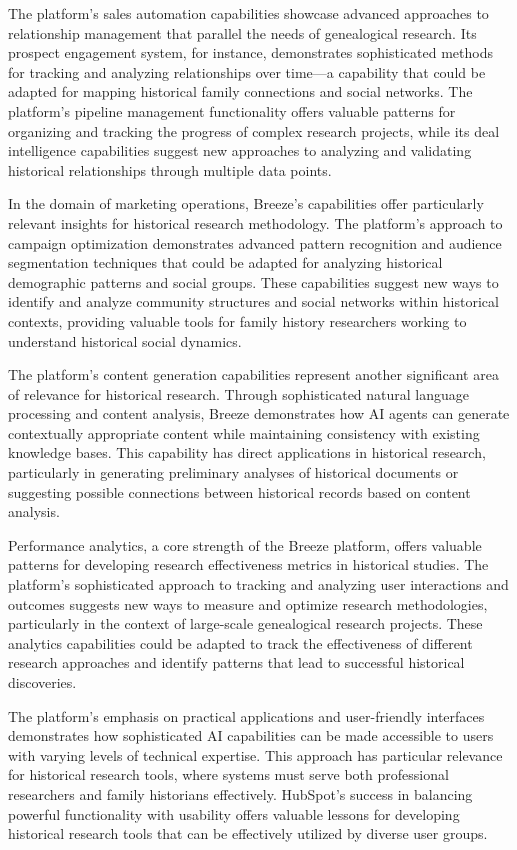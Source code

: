 \documentclass[
]{article}
\begin{document}
The platform's sales automation capabilities showcase advanced
approaches to relationship management that parallel the needs of
genealogical research. Its prospect engagement system, for instance,
demonstrates sophisticated methods for tracking and analyzing
relationships over time---a capability that could be adapted for mapping
historical family connections and social networks. The platform's
pipeline management functionality offers valuable patterns for
organizing and tracking the progress of complex research projects, while
its deal intelligence capabilities suggest new approaches to analyzing
and validating historical relationships through multiple data points.

In the domain of marketing operations, Breeze's capabilities offer
particularly relevant insights for historical research methodology. The
platform's approach to campaign optimization demonstrates advanced
pattern recognition and audience segmentation techniques that could be
adapted for analyzing historical demographic patterns and social groups.
These capabilities suggest new ways to identify and analyze community
structures and social networks within historical contexts, providing
valuable tools for family history researchers working to understand
historical social dynamics.

The platform's content generation capabilities represent another
significant area of relevance for historical research. Through
sophisticated natural language processing and content analysis, Breeze
demonstrates how AI agents can generate contextually appropriate content
while maintaining consistency with existing knowledge bases. This
capability has direct applications in historical research, particularly
in generating preliminary analyses of historical documents or suggesting
possible connections between historical records based on content
analysis.

Performance analytics, a core strength of the Breeze platform, offers
valuable patterns for developing research effectiveness metrics in
historical studies. The platform's sophisticated approach to tracking
and analyzing user interactions and outcomes suggests new ways to
measure and optimize research methodologies, particularly in the context
of large-scale genealogical research projects. These analytics
capabilities could be adapted to track the effectiveness of different
research approaches and identify patterns that lead to successful
historical discoveries.

The platform's emphasis on practical applications and user-friendly
interfaces demonstrates how sophisticated AI capabilities can be made
accessible to users with varying levels of technical expertise. This
approach has particular relevance for historical research tools, where
systems must serve both professional researchers and family historians
effectively. HubSpot's success in balancing powerful functionality with
usability offers valuable lessons for developing historical research
tools that can be effectively utilized by diverse user groups.
\end{document}
